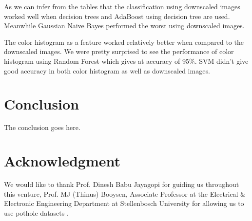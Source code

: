 \documentclass[journal]{IEEEtran}
\begin{document}
As we can infer from the tables that the classification using downscaled images worked well when decision trees and AdaBoost using decision tree are used. Meanwhile Gaussian Naive Bayes performed the worst using downscaled images.

The color histogram as a feature worked relatively better when compared to the downscaled images. We were pretty surprised to see the performance of color histogram using Random Forest which gives at accuracy of 
95$\%$. SVM didn't give good accuracy in both color histogram as well as downscaled images.

\section{Conclusion}
The conclusion goes here.


%


\section*{Acknowledgment}
We would like to thank Prof. Dinesh Babu Jayagopi for guiding us throughout this venture, Prof. MJ (Thinus) Booysen, Associate Professor at the Electrical $\&$ Electronic Engineering Department at Stellenbosch University for allowing us to use pothole datasets \cite{dataset}.


\ifCLASSOPTIONcaptionsoff
  \newpage
\fi
\end{document}
